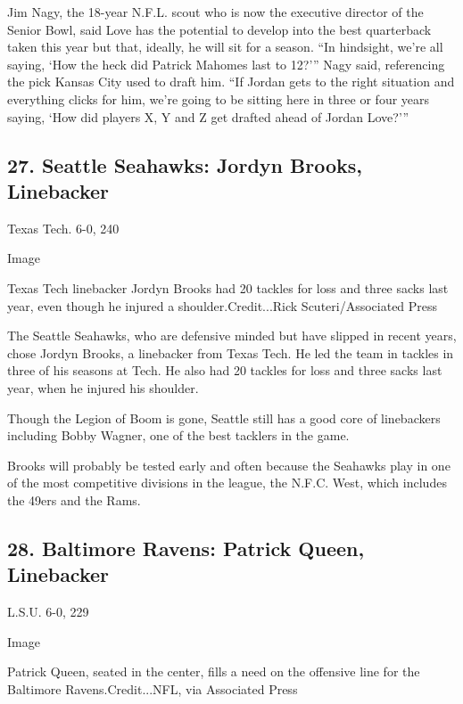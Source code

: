 Jim Nagy, the 18-year N.F.L. scout who is now the executive director of
the Senior Bowl, said Love has the potential to develop into the best
quarterback taken this year but that, ideally, he will sit for a season.
``In hindsight, we're all saying, `How the heck did Patrick Mahomes last
to 12?''' Nagy said, referencing the pick Kansas City used to draft him.
``If Jordan gets to the right situation and everything clicks for him,
we're going to be sitting here in three or four years saying, `How did
players X, Y and Z get drafted ahead of Jordan Love?'''

\hypertarget{27-seattle-seahawks-jordyn-brooks-linebacker}{%
\subsection{27. Seattle Seahawks: Jordyn Brooks,
Linebacker}\label{27-seattle-seahawks-jordyn-brooks-linebacker}}

Texas Tech. 6-0, 240

Image

Texas Tech linebacker Jordyn Brooks had 20 tackles for loss and three
sacks last year, even though he injured a shoulder.Credit...Rick
Scuteri/Associated Press

The Seattle Seahawks, who are defensive minded but have slipped in
recent years, chose Jordyn Brooks, a linebacker from Texas Tech. He led
the team in tackles in three of his seasons at Tech. He also had 20
tackles for loss and three sacks last year, when he injured his
shoulder.

Though the Legion of Boom is gone, Seattle still has a good core of
linebackers including Bobby Wagner, one of the best tacklers in the
game.

Brooks will probably be tested early and often because the Seahawks play
in one of the most competitive divisions in the league, the N.F.C. West,
which includes the 49ers and the Rams.

\hypertarget{28-baltimore-ravens-patrick-queen-linebacker}{%
\subsection{28. Baltimore Ravens: Patrick Queen,
Linebacker}\label{28-baltimore-ravens-patrick-queen-linebacker}}

L.S.U. 6-0, 229

Image

Patrick Queen, seated in the center, fills a need on the offensive line
for the Baltimore Ravens.Credit...NFL, via Associated Press

